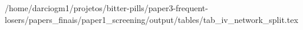 /home/darciogm1/projetos/bitter-pills/paper3-frequent-losers/papers_finais/paper1_screening/output/tables/tab_iv_network_split.tex